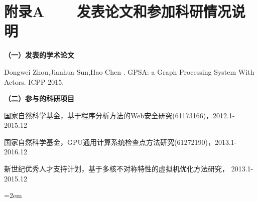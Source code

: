 
\chapter*{附录A~~~~发表论文和参加科研情况说明}
\setlength{\parindent}{0em}
\textbf{（一）发表的学术论文}
\begin{publist}
	\item Dongwei Zhou,Jianhua Sun,Hao Chen . GPSA: a Graph Processing System With Actors. ICPP 2015.
\end{publist}

\vspace*{1em}

\textbf{（二）参与的科研项目}
\begin{publist}
\item 国家自然科学基金，基于程序分析方法的Web安全研究(61173166)，2012.1-2015.12

\item 国家自然科学基金，GPU通用计算系统检查点方法研究(61272190)，2013.1-2016.12

\item 新世纪优秀人才支持计划，基于多核不对称特性的虚拟机优化方法研究， 2013.1-2015.12
\end{publist}
\vfill
{}\hangindent=2em\noindent

\setlength{\parindent}{2em}
